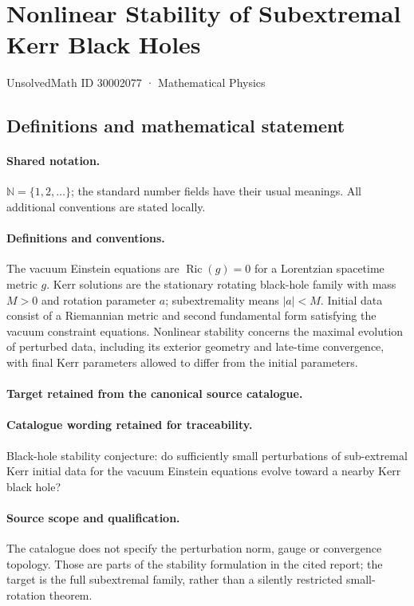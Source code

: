 \documentclass[11pt]{article}
\begin{document}
\setcounter{section}{30002076}
\section{Nonlinear Stability of Subextremal Kerr Black Holes}\label{30002077}
{\small UnsolvedMath ID 30002077 · Mathematical Physics}
\subsection{Definitions and mathematical statement}

\paragraph{Shared notation.}$\mathbb N=\{1,2,\ldots\}$; the standard number fields have their usual meanings. All additional conventions are stated locally.


\paragraph{Definitions and conventions.}
The vacuum Einstein equations are $\operatorname{Ric}(g)=0$ for a Lorentzian spacetime metric $g$. Kerr solutions are the stationary rotating black-hole family with mass $M>0$ and rotation parameter $a$; subextremality means $|a|<M$. Initial data consist of a Riemannian metric and second fundamental form satisfying the vacuum constraint equations. Nonlinear stability concerns the maximal evolution of perturbed data, including its exterior geometry and late-time convergence, with final Kerr parameters allowed to differ from the initial parameters.

\paragraph{Target retained from the canonical source catalogue.}
\paragraph{Catalogue wording retained for traceability.}
Black-hole stability conjecture: do sufficiently small perturbations of sub-extremal Kerr initial data for the vacuum Einstein equations evolve toward a nearby Kerr black hole?

\paragraph{Source scope and qualification.}
The catalogue does not specify the perturbation norm, gauge or convergence topology. Those are parts of the stability formulation in the cited report; the target is the full subextremal family, rather than a silently restricted small-rotation theorem.
\end{document}

